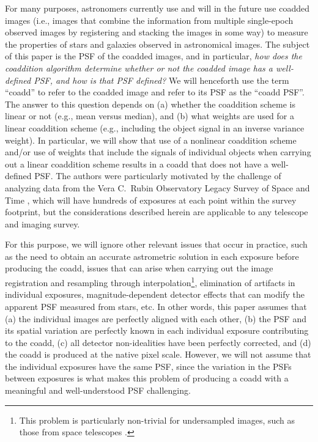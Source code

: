 \documentclass{aastex63}
\newcommand{\irresponse}[1]{{#1}}
\begin{document}
For many purposes, \irresponse{astronomers} currently use and will in \irresponse{the} future use coadded images \irresponse{(i.e., images that combine the information from multiple single-epoch observed images by registering and stacking the images in some way)} to measure the properties of stars and galaxies observed in astronomical images.  The subject of this paper is the PSF of the coadded images, and in particular, {\em \irresponse{how does the coaddition algorithm determine whether or not the coadded image has a well-defined PSF, and how is that PSF defined?}}  We will henceforth use the term ``coadd'' to refer to the coadded image and refer to its PSF as the ``coadd PSF''.  The answer to this question depends on (a) whether the coaddition scheme is linear or not (e.g., mean versus median), and (b) what weights are used for a linear coaddition scheme (e.g., including the object signal in an inverse variance weight). In particular, we will show that use of a nonlinear coaddition scheme and/or use of weights that include the signals of individual objects when carrying out a linear coaddition scheme results in a coadd that does not have a well-defined PSF. \irresponse{The authors were particularly motivated by the challenge of analyzing data from the Vera C.\ Rubin Observatory Legacy Survey of Space and Time \citep[LSST;][]{2009arXiv0912.0201L,2019ApJ...873..111I}, which will have hundreds of exposures at each point within the survey footprint, but the considerations described herein are applicable to any telescope and imaging survey.}

For this purpose, we will ignore other relevant issues that occur in practice, such as the need to obtain an accurate astrometric solution in each exposure before producing the coadd, issues that can arise when carrying out the image registration and resampling through interpolation\footnote{This problem is particularly non-trivial for undersampled images\irresponse{, such as those from space telescopes \citep[see discussion in][]{2011ApJ...741...46R}}.}, elimination of artifacts in individual exposures, magnitude-dependent detector effects that can modify the apparent PSF measured from stars, etc.  In other words, this paper assumes that (a) the individual images are perfectly aligned with each other, (b) the PSF and its spatial variation are perfectly known in each individual exposure contributing to the coadd, (c) all detector non-idealities have been perfectly corrected, and (d) the coadd is produced at the native pixel scale. 
However, we will not assume that the individual exposures have the same PSF, \irresponse{since the} variation in \irresponse{the} PSFs between exposures is what makes this problem of producing a coadd with a meaningful and well-understood PSF challenging. 
\end{document}
